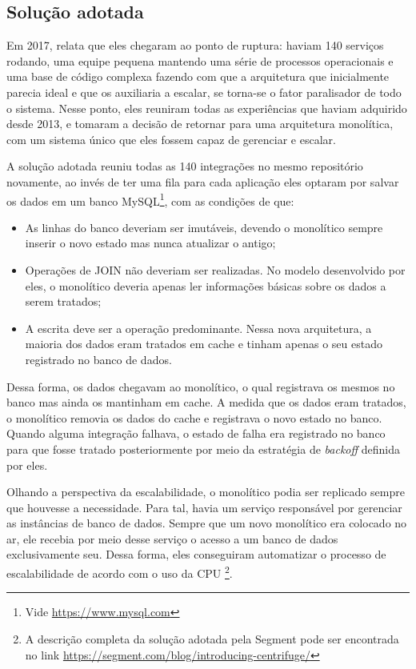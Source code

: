 \subsection{Solução adotada}

Em 2017,  relata que eles chegaram ao ponto de
ruptura: haviam 140 serviços rodando, uma equipe pequena mantendo uma série de processos
operacionais e uma base de código complexa fazendo com que a arquitetura que inicialmente parecia
ideal e que os auxiliaria a escalar, se torna-se o fator paralisador de todo o sistema. Nesse ponto,
eles reuniram todas as experiências que haviam adquirido desde 2013, e tomaram a decisão de retornar
para uma arquitetura monolítica, com um sistema único que eles fossem capaz de gerenciar e escalar.

A solução adotada reuniu todas as 140 integrações no mesmo repositório novamente, ao invés de ter
uma fila para cada aplicação eles optaram por salvar os dados em um banco MySQL\footnote{Vide
\url{https://www.mysql.com}}, com as condições de que:

\begin{itemize}
    \item As linhas do banco deveriam ser imutáveis, devendo o monolítico sempre inserir o novo
        estado mas nunca atualizar o antigo;
    \item Operações de JOIN não deveriam ser realizadas. No modelo desenvolvido por eles, o
        monolítico deveria apenas ler informações básicas sobre os dados a serem tratados;
    \item A escrita deve ser a operação predominante. Nessa nova arquitetura, a maioria dos dados
        eram tratados em cache e tinham apenas o seu estado registrado no banco de dados.
\end{itemize}

Dessa forma, os dados chegavam ao monolítico, o qual registrava os mesmos no banco mas ainda os
mantinham em cache. A medida que os dados eram tratados, o monolítico removia os dados do cache e
registrava o novo estado no banco. Quando alguma integração falhava, o estado de falha era
registrado no banco para que fosse tratado posteriormente por meio da estratégia de \textit{backoff}
definida por eles.

Olhando a perspectiva da escalabilidade, o monolítico podia ser replicado sempre que houvesse a
necessidade. Para tal, havia um serviço responsável por gerenciar as instâncias de banco de dados.
Sempre que um novo monolítico era colocado no ar, ele recebia por meio desse serviço o acesso a um
banco de dados exclusivamente seu. Dessa forma, eles conseguiram automatizar o processo de
escalabilidade de acordo com o uso da CPU \cite{Segment2018:Centrifuge}\footnote{A descrição
completa da solução adotada pela Segment pode ser encontrada no link \url{https://segment.com/blog/introducing-centrifuge/}}.

